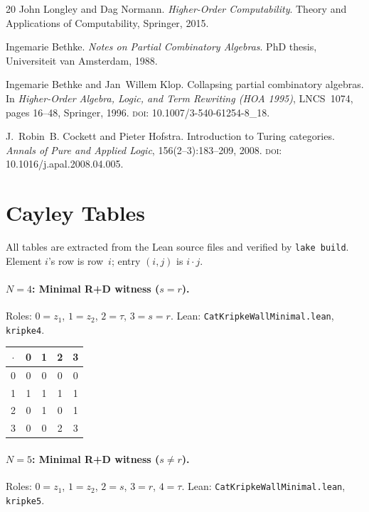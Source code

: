 \documentclass[sigconf,screen,review,anonymous]{acmart}
\newcommand{\dotop}{\cdot}
\theoremstyle{remark}
\begin{document}
\begin{thebibliography}{20}
John Longley and Dag Normann.
\newblock \emph{Higher-Order Computability}.
\newblock Theory and Applications of Computability, Springer, 2015.

Ingemarie Bethke.
\newblock \emph{Notes on Partial Combinatory Algebras}.
\newblock PhD thesis, Universiteit van Amsterdam, 1988.

Ingemarie Bethke and Jan~Willem Klop.
\newblock Collapsing partial combinatory algebras.
\newblock In \emph{Higher-Order Algebra, Logic, and Term Rewriting (HOA 1995)}, LNCS~1074, pages 16--48, Springer, 1996. \textsc{doi}: 10.1007/3-540-61254-8\_18.

J.~Robin~B. Cockett and Pieter Hofstra.
\newblock Introduction to {T}uring categories.
\newblock \emph{Annals of Pure and Applied Logic}, 156(2--3):183--209, 2008. \textsc{doi}: 10.1016/j.apal.2008.04.005.

\end{thebibliography}

\appendix

\section{Cayley Tables}
\label{app:tables}

All tables are extracted from the Lean source files and verified by \texttt{lake build}. Element $i$'s row is row~$i$; entry $(i,j)$ is $i \dotop j$.

\paragraph{$N\!=\!4$: Minimal R+D witness ($s = r$).}
Roles: $0 = z_1$, $1 = z_2$, $2 = \tau$, $3 = s = r$. \quad Lean: \texttt{CatKripkeWallMinimal.lean}, \texttt{kripke4}.

\medskip
{\small
\begin{tabular}{c|cccc}
$\dotop$ & 0 & 1 & 2 & 3 \\\hline
0 & 0 & 0 & 0 & 0 \\
1 & 1 & 1 & 1 & 1 \\
2 & 0 & 1 & 0 & 1 \\
3 & 0 & 0 & 2 & 3 \\
\end{tabular}}

\paragraph{$N\!=\!5$: Minimal R+D witness ($s \neq r$).}
Roles: $0 = z_1$, $1 = z_2$, $2 = s$, $3 = r$, $4 = \tau$. \quad Lean: \texttt{CatKripkeWallMinimal.lean}, \texttt{kripke5}.
\end{document}
